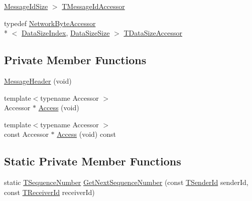 \begin{DoxyCompactItemize}
\hyperlink{class_terra_swarm_1_1_message_header_a189acad5bd9f60fe47b3381da62d3484a9008a5ec8c433f7c7f74c1c150581ea2}{Message\-Id\-Size} $>$ \hyperlink{class_terra_swarm_1_1_message_header_a269de9ac839cc588d65fad2e27f6dcbb}{T\-Message\-Id\-Accessor}
\item 
typedef \hyperlink{class_terra_swarm_1_1_network_byte_accessor}{Network\-Byte\-Accessor}\\*
$<$ \hyperlink{class_terra_swarm_1_1_message_header_a2a96f83a96cfee0465da982814cb372aa8bf63201f7bd66a6757cefa82db24548}{Data\-Size\-Index}, \hyperlink{class_terra_swarm_1_1_message_header_a189acad5bd9f60fe47b3381da62d3484a3ef403fe13fcd865a980e28ad63dac48}{Data\-Size\-Size} $>$ \hyperlink{class_terra_swarm_1_1_message_header_aed583369adabf273cabc86e379229537}{T\-Data\-Size\-Accessor}
\end{DoxyCompactItemize}
\subsection*{Private Member Functions}
\begin{DoxyCompactItemize}
\item 
\hyperlink{class_terra_swarm_1_1_message_header_a3a3365d5965976b4ff944e90bcc57d10}{Message\-Header} (void)
\item 
{\footnotesize template$<$typename Accessor $>$ }\\Accessor $\ast$ \hyperlink{class_terra_swarm_1_1_message_header_adf08e6517af2015ca25f0cadeaf90126}{Access} (void)
\item 
{\footnotesize template$<$typename Accessor $>$ }\\const Accessor $\ast$ \hyperlink{class_terra_swarm_1_1_message_header_aaa0d3fbe9cd0e0c63384810e57c246f1}{Access} (void) const 
\end{DoxyCompactItemize}
\subsection*{Static Private Member Functions}
\begin{DoxyCompactItemize}
\item 
static \hyperlink{class_terra_swarm_1_1_message_header_a0d92af0bc15cc856a21975d1f3813eb5}{T\-Sequence\-Number} \hyperlink{class_terra_swarm_1_1_message_header_a963b8a46a389a741f86471dbd722cae2}{Get\-Next\-Sequence\-Number} (const \hyperlink{class_terra_swarm_1_1_message_header_a516b36855e2aad7cfbf8770f1b42784f}{T\-Sender\-Id} sender\-Id, const \hyperlink{class_terra_swarm_1_1_message_header_aa3260702b182b6f88ddbdd3416e98df0}{T\-Receiver\-Id} receiver\-Id)
\end{DoxyCompactItemize}


